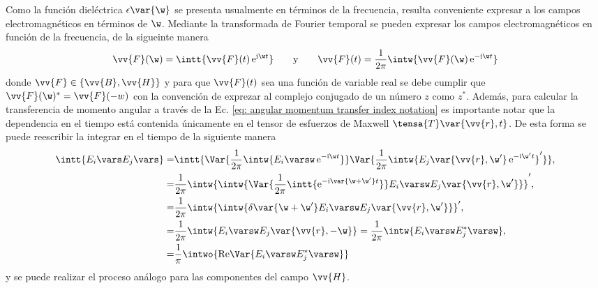 Como la función dieléctrica $\epsilon\var{\w}$ se presenta usualmente en términos de la frecuencia, resulta conveniente expresar a los campos electromagnéticos en términos de $\w$. Mediante la transformada de Fourier temporal se pueden expresar los campos electromagnéticos en función de la frecuencia, de la sigueinte manera
\begin{equation}
\vv{F}(\w) = \intt{\vv{F}(t)\,{\rm e}^{{\rm i} \w t}} \qquad \text{y} \qquad \vv{F}(t) = \frac{1}{2\pi}\intw{\vv{F}(\w)\,{\rm e}^{-{\rm i} \w t}}
\end{equation}
donde $\vv{F}\in \{ \vv{B}, \vv{H}\}$ y para que $\vv{F}(t)$ sea una función de variable real se debe cumplir que $\vv{F}(\w)^{*}=\vv{F}(-w)$ con la convención de exprezar al complejo conjugado de un número $z$ como $z^{*}$. Además, para calcular la transferencia de momento angular a través de la Ec. \eqref{eq: angular momentum transfer index notation} es importante notar que la dependencia en el tiempo está contenida únicamente en el tensor de esfuerzos de Maxwell $\tensa{T}\var{\vv{r},t}$. De esta forma se puede reescribir la integrar en el tiempo de la siguiente manera
\begin{align}
\intt{E_i\vars E_j \vars} =& \intt{\Var{\frac{1}{2\pi}\intw{E_i\varsw \,{\rm e}^{-{\rm i} \w t} }} \Var{\frac{1}{2\pi}\intw{E_j\var{\vv{r},\w^{\prime}} \,{\rm e}^{-{\rm i} \w^{\prime} t} }^{\prime}} },\nonumber\\
=&\frac{1}{2\pi} \intw{\intw{\Var{\frac{1}{2\pi}\intt{{\rm e}^{-{\rm i}\var{\w+\w^{\prime}} t}}} E_i \varsw E_j\var{\vv{r},\w^{\prime}}}}^{\prime},\nonumber\\
=&\frac{1}{2\pi}\intw{\intw{\delta\var{\w+\w^{\prime}} E_i \varsw E_j\var{\vv{r},\w^{\prime}} }}^{\prime},\nonumber\\
=&\frac{1}{2\pi}\intw{ E_i \varsw E_j\var{\vv{r},-\w} }=\frac{1}{2\pi}\intw{ E_i \varsw E_j^{*}\varsw },\nonumber\\
=&\frac{1}{\pi}\intwo{{\rm Re}\Var{E_i\varsw E_j^{*}\varsw}}
\end{align}
y se puede realizar el proceso análogo para las componentes del campo $\vv{H}$.

